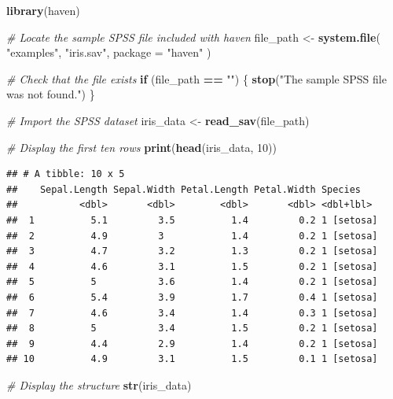 \documentclass[
]{article}
\newenvironment{Shaded}{\begin{snugshade}}{\end{snugshade}}
\newcommand{\AttributeTok}[1]{\textcolor[rgb]{0.13,0.29,0.53}{#1}}
\newcommand{\CommentTok}[1]{\textcolor[rgb]{0.56,0.35,0.01}{\textit{#1}}}
\newcommand{\ControlFlowTok}[1]{\textcolor[rgb]{0.13,0.29,0.53}{\textbf{#1}}}
\newcommand{\DecValTok}[1]{\textcolor[rgb]{0.00,0.00,0.81}{#1}}
\newcommand{\FunctionTok}[1]{\textcolor[rgb]{0.13,0.29,0.53}{\textbf{#1}}}
\newcommand{\NormalTok}[1]{#1}
\newcommand{\OtherTok}[1]{\textcolor[rgb]{0.56,0.35,0.01}{#1}}
\newcommand{\SpecialCharTok}[1]{\textcolor[rgb]{0.81,0.36,0.00}{\textbf{#1}}}
\newcommand{\StringTok}[1]{\textcolor[rgb]{0.31,0.60,0.02}{#1}}
\begin{document}
\begin{Shaded}
\begin{Highlighting}[]
\FunctionTok{library}\NormalTok{(haven)}

\CommentTok{\# Locate the sample SPSS file included with haven}
\NormalTok{file\_path }\OtherTok{\textless{}{-}} \FunctionTok{system.file}\NormalTok{(}
  \StringTok{"examples"}\NormalTok{,}
  \StringTok{"iris.sav"}\NormalTok{,}
  \AttributeTok{package =} \StringTok{"haven"}
\NormalTok{)}

\CommentTok{\# Check that the file exists}
\ControlFlowTok{if}\NormalTok{ (file\_path }\SpecialCharTok{==} \StringTok{""}\NormalTok{) \{}
  \FunctionTok{stop}\NormalTok{(}\StringTok{"The sample SPSS file was not found."}\NormalTok{)}
\NormalTok{\}}

\CommentTok{\# Import the SPSS dataset}
\NormalTok{iris\_data }\OtherTok{\textless{}{-}} \FunctionTok{read\_sav}\NormalTok{(file\_path)}

\CommentTok{\# Display the first ten rows}
\FunctionTok{print}\NormalTok{(}\FunctionTok{head}\NormalTok{(iris\_data, }\DecValTok{10}\NormalTok{))}
\end{Highlighting}
\end{Shaded}

\begin{verbatim}
## # A tibble: 10 x 5
##    Sepal.Length Sepal.Width Petal.Length Petal.Width Species   
##           <dbl>       <dbl>        <dbl>       <dbl> <dbl+lbl> 
##  1          5.1         3.5          1.4         0.2 1 [setosa]
##  2          4.9         3            1.4         0.2 1 [setosa]
##  3          4.7         3.2          1.3         0.2 1 [setosa]
##  4          4.6         3.1          1.5         0.2 1 [setosa]
##  5          5           3.6          1.4         0.2 1 [setosa]
##  6          5.4         3.9          1.7         0.4 1 [setosa]
##  7          4.6         3.4          1.4         0.3 1 [setosa]
##  8          5           3.4          1.5         0.2 1 [setosa]
##  9          4.4         2.9          1.4         0.2 1 [setosa]
## 10          4.9         3.1          1.5         0.1 1 [setosa]
\end{verbatim}

\begin{Shaded}
\begin{Highlighting}[]
\CommentTok{\# Display the structure}
\FunctionTok{str}\NormalTok{(iris\_data)}
\end{Highlighting}
\end{Shaded}
\end{document}
